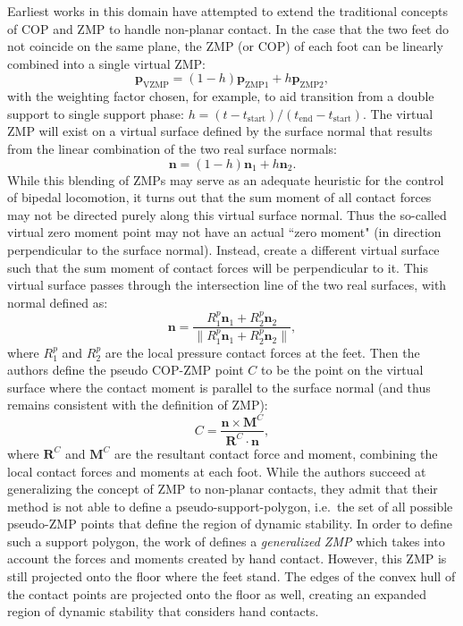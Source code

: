 \documentclass[12pt,a4paper,twoside]{article}
\newcommand{\vvc}[1]{{\bm{#1}}}
\newcommand{\p}{\vvc{p}}
\begin{document}
Earliest works in this domain have attempted to extend the traditional concepts of COP and ZMP to handle non-planar contact. In the case that the two feet do not coincide on the same plane, the ZMP (or COP) of each foot can be linearly combined into a single virtual ZMP\cite{takenaka1999gait}: 
\begin{equation}
\p_\text{VZMP} = (1-h)\p_\text{ZMP1}+h\p_\text{ZMP2},
\end{equation}
with the weighting factor chosen, for example, to aid transition from a double support to single support phase: $h = (t-t_\text{start})/(t_\text{end} - t_\text{start})$. The virtual ZMP will exist on a virtual surface defined by  the surface normal that results from the linear combination of the two real surface normals:
\begin{equation}
\vvc{n} = (1-h)\vvc{n}_1 + h\vvc{n}_2.
\end{equation} 
While this blending of ZMPs may serve as an adequate heuristic for the control of bipedal locomotion, it turns out that the sum moment of all contact forces may not be directed purely along this virtual surface normal. Thus the so-called virtual zero moment point may not have an actual ``zero moment" (in direction perpendicular to the surface normal).  Instead, \cite{Sardain2004} create a different virtual surface such that the sum moment of contact forces will be perpendicular to it. This virtual surface passes through the intersection line of the two real surfaces, with normal defined as:
\begin{equation}
\vvc{n} = \frac{R_1^p\vvc{n}_1 + R_2^p\vvc{n}_2}{\|R_1^p\vvc{n}_1 + R_2^p\vvc{n}_2\|},
\end{equation}
where $R_1^p$ and $R_2^p$ are the local pressure contact forces at the feet. Then the authors define the pseudo COP-ZMP point $C$ to be the point on the virtual surface where the contact moment is parallel to the surface normal (and thus remains consistent with the definition of ZMP):
\begin{equation}
C=\frac{\vvc{n} \times \vvc{M}^C}{\vvc{R}^C \cdot \vvc{n}},
\end{equation}
where $\vvc{R}^C$ and $\vvc{M}^C$ are the resultant contact force and moment, combining the local contact forces and moments at each foot. While the authors succeed at generalizing the concept of ZMP to non-planar contacts, they admit that their method is not able to define a pseudo-support-polygon, i.e.\ the set of all possible pseudo-ZMP points that define the region of dynamic stability.  In order to define such a support polygon, the work of \cite{Harada2003} defines a \emph{generalized ZMP} which takes into account the forces and moments created by hand contact. However, this ZMP is still projected onto the floor where the feet stand.  The edges of the convex hull of the contact points are projected onto the floor as well, creating an expanded region of dynamic stability that considers hand contacts. 
\end{document}
